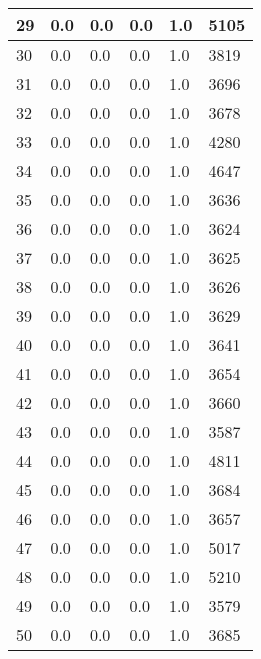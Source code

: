 \begin{longtable}{|l|l|l|l|l|l|}
29 & 0.0 & 0.0 & 0.0 & 1.0 & 5105 \\ \hline 
30 & 0.0 & 0.0 & 0.0 & 1.0 & 3819 \\ \hline 
31 & 0.0 & 0.0 & 0.0 & 1.0 & 3696 \\ \hline 
32 & 0.0 & 0.0 & 0.0 & 1.0 & 3678 \\ \hline 
33 & 0.0 & 0.0 & 0.0 & 1.0 & 4280 \\ \hline 
34 & 0.0 & 0.0 & 0.0 & 1.0 & 4647 \\ \hline 
35 & 0.0 & 0.0 & 0.0 & 1.0 & 3636 \\ \hline 
36 & 0.0 & 0.0 & 0.0 & 1.0 & 3624 \\ \hline 
37 & 0.0 & 0.0 & 0.0 & 1.0 & 3625 \\ \hline 
38 & 0.0 & 0.0 & 0.0 & 1.0 & 3626 \\ \hline 
39 & 0.0 & 0.0 & 0.0 & 1.0 & 3629 \\ \hline 
40 & 0.0 & 0.0 & 0.0 & 1.0 & 3641 \\ \hline 
41 & 0.0 & 0.0 & 0.0 & 1.0 & 3654 \\ \hline 
42 & 0.0 & 0.0 & 0.0 & 1.0 & 3660 \\ \hline 
43 & 0.0 & 0.0 & 0.0 & 1.0 & 3587 \\ \hline 
44 & 0.0 & 0.0 & 0.0 & 1.0 & 4811 \\ \hline 
45 & 0.0 & 0.0 & 0.0 & 1.0 & 3684 \\ \hline 
46 & 0.0 & 0.0 & 0.0 & 1.0 & 3657 \\ \hline 
47 & 0.0 & 0.0 & 0.0 & 1.0 & 5017 \\ \hline 
48 & 0.0 & 0.0 & 0.0 & 1.0 & 5210 \\ \hline 
49 & 0.0 & 0.0 & 0.0 & 1.0 & 3579 \\ \hline 
50 & 0.0 & 0.0 & 0.0 & 1.0 & 3685 \\ \hline 
\end{longtable}